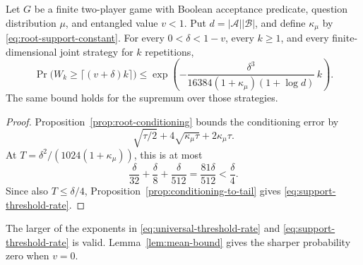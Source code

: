 \begin{corollary}\label{cor:support-threshold}
Let $G$ be a finite two-player game with Boolean acceptance predicate,
question distribution $\mu$, and entangled value $v<1$. Put
$d=|\mathcal A||\mathcal B|$, and define $\kappa_\mu$ by
\eqref{eq:root-support-constant}. For every $0<\delta<1-v$, every
$k\ge1$, and every finite-dimensional joint strategy for $k$ repetitions,
\begin{equation}\label{eq:support-threshold-rate}
 \Pr\bigl(W_k\ge\lceil(v+\delta)k\rceil\bigr)
 \le\exp\left(-\frac{\delta^3}
 {16384(1+\kappa_\mu)(1+\log d)}\,k\right).
\end{equation}
The same bound holds for the supremum over those strategies.
\end{corollary}
\begin{proof}
Proposition~\ref{prop:root-conditioning} bounds the conditioning error by
\[
 \sqrt{\tau/2}+4\sqrt{\kappa_\mu\tau}+2\kappa_\mu\tau.
\]
At $T=\delta^2/(1024(1+\kappa_\mu))$, this is at most
\[
 \frac\delta{32}+\frac\delta8+\frac\delta{512}
 =\frac{81\delta}{512}<\frac\delta4.
\]
Since also $T\le\delta/4$, Proposition~\ref{prop:conditioning-to-tail}
gives \eqref{eq:support-threshold-rate}.
\end{proof}
The larger of the exponents in
\eqref{eq:universal-threshold-rate} and \eqref{eq:support-threshold-rate}
is valid. Lemma~\ref{lem:mean-bound} gives the sharper probability zero
when $v=0$.
